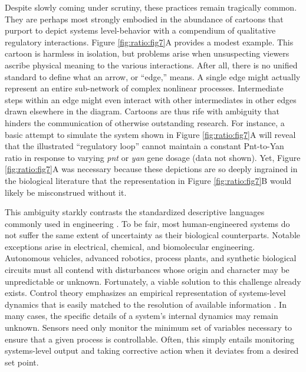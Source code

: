 Despite slowly coming under scrutiny, these practices remain tragically common. They are perhaps most strongly embodied in the abundance of cartoons that purport to depict systems level-behavior with a compendium of qualitative regulatory interactions. Figure \ref{fig:ratio:fig7}A provides a modest example. This cartoon is harmless in isolation, but problems arise when unsuspecting viewers ascribe physical meaning to the various interactions. After all, there is no unified standard to define what an arrow, or ``edge,'' means. A single edge might actually represent an entire sub-network of complex nonlinear processes. Intermediate steps within an edge might even interact with other intermediates in other edges drawn elsewhere in the diagram. Cartoons are thus rife with ambiguity that hinders the communication of otherwise outstanding research. For instance, a basic attempt to simulate the system shown in Figure \ref{fig:ratio:fig7}A will reveal that the illustrated ``regulatory loop'' cannot maintain a constant Pnt-to-Yan ratio in response to varying \textit{pnt} or \textit{yan} gene dosage (data not shown). Yet, Figure \ref{fig:ratio:fig7}A was necessary because these depictions are so deeply ingrained in the biological literature that the representation in Figure \ref{fig:ratio:fig7}B would likely be misconstrued without it.

This ambiguity starkly contrasts the standardized descriptive languages commonly used in engineering \cite{Lazebnik2004}. To be fair, most human-engineered systems do not suffer the same extent of uncertainty as their biological counterparts. Notable exceptions arise in electrical, chemical, and biomolecular engineering. Autonomous vehicles, advanced robotics, process plants, and synthetic biological circuits must all contend with disturbances whose origin and character may be unpredictable or unknown. Fortunately, a viable solution to this challenge already exists. Control theory emphasizes an empirical representation of systems-level dynamics that is easily matched to the resolution of available information \cite{Seborg2011}. In many cases, the specific details of a system's internal dynamics may remain unknown. Sensors need only monitor the minimum set of variables necessary to ensure that a given process is controllable. Often, this simply entails monitoring systems-level output and taking corrective action when it deviates from a desired set point. 

